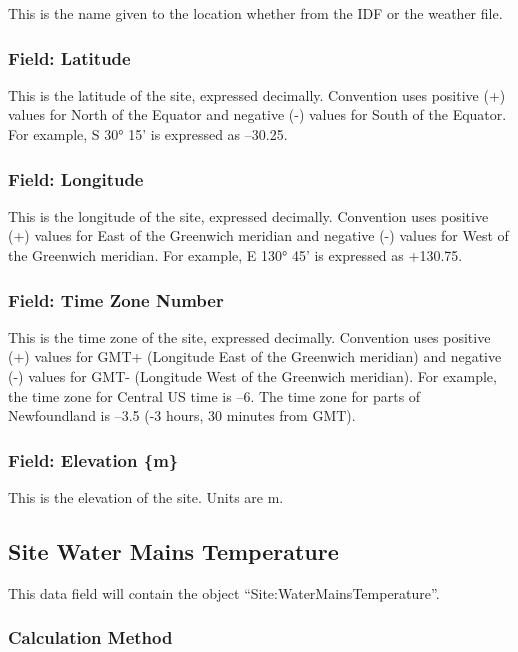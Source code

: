This is the name given to the location whether from the IDF or the weather file.

\subsubsection{Field: Latitude}\label{field-latitude}

This is the latitude of the site, expressed decimally. Convention uses positive (+) values for North of the Equator and negative (-) values for South of the Equator. For example, S 30° 15' is expressed as --30.25.

\subsubsection{Field: Longitude}\label{field-longitude}

This is the longitude of the site, expressed decimally. Convention uses positive (+) values for East of the Greenwich meridian and negative (-) values for West of the Greenwich meridian. For example, E 130° 45' is expressed as +130.75.

\subsubsection{Field: Time Zone Number}\label{field-time-zone-number}

This is the time zone of the site, expressed decimally. Convention uses positive (+) values for GMT+ (Longitude East of the Greenwich meridian) and negative (-) values for GMT- (Longitude West of the Greenwich meridian). For example, the time zone for Central US time is --6. The time zone for parts of Newfoundland is --3.5 (-3 hours, 30 minutes from GMT).

\subsubsection{Field: Elevation \{m\}}\label{field-elevation-m}

This is the elevation of the site. Units are m.

\subsection{Site Water Mains Temperature}\label{site-water-mains-temperature}

This data field will contain the object ``Site:WaterMainsTemperature''.

\subsubsection{Calculation Method}\label{calculation-method}

